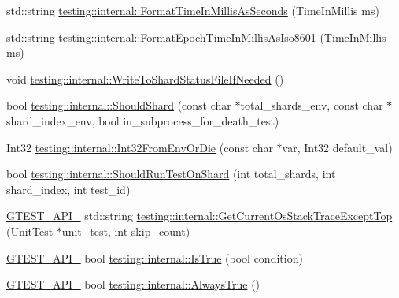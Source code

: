 \begin{DoxyCompactItemize}
\item 
std\+::string \mbox{\hyperlink{namespacetesting_1_1internal_a904485f27a54be8a5a92856e2d838797}{testing\+::internal\+::\+Format\+Time\+In\+Millis\+As\+Seconds}} (Time\+In\+Millis ms)
\item 
std\+::string \mbox{\hyperlink{namespacetesting_1_1internal_a5ef227c4a610e7ff638b12dfb25b068e}{testing\+::internal\+::\+Format\+Epoch\+Time\+In\+Millis\+As\+Iso8601}} (Time\+In\+Millis ms)
\item 
void \mbox{\hyperlink{namespacetesting_1_1internal_a19b35b39782d41e6ef76e1910a3a502e}{testing\+::internal\+::\+Write\+To\+Shard\+Status\+File\+If\+Needed}} ()
\item 
bool \mbox{\hyperlink{namespacetesting_1_1internal_a8688e48645d951b8e42b61d2e4b2890e}{testing\+::internal\+::\+Should\+Shard}} (const char $\ast$total\+\_\+shards\+\_\+env, const char $\ast$shard\+\_\+index\+\_\+env, bool in\+\_\+subprocess\+\_\+for\+\_\+death\+\_\+test)
\item 
Int32 \mbox{\hyperlink{namespacetesting_1_1internal_a7e70cddd54da21e2c2608613d51288e2}{testing\+::internal\+::\+Int32\+From\+Env\+Or\+Die}} (const char $\ast$var, Int32 default\+\_\+val)
\item 
bool \mbox{\hyperlink{namespacetesting_1_1internal_a437bd89f5bc532778d7467600e210395}{testing\+::internal\+::\+Should\+Run\+Test\+On\+Shard}} (int total\+\_\+shards, int shard\+\_\+index, int test\+\_\+id)
\item 
\mbox{\hyperlink{_obj__test_2lib_2googletest-release-1_88_81_2googletest_2include_2gtest_2internal_2gtest-port_8h_aa73be6f0ba4a7456180a94904ce17790}{G\+T\+E\+S\+T\+\_\+\+A\+P\+I\+\_\+}} std\+::string \mbox{\hyperlink{namespacetesting_1_1internal_aeb475922b8cd1e6c60ac052bbc396e62}{testing\+::internal\+::\+Get\+Current\+Os\+Stack\+Trace\+Except\+Top}} (Unit\+Test $\ast$unit\+\_\+test, int skip\+\_\+count)
\item 
\mbox{\hyperlink{_obj__test_2lib_2googletest-release-1_88_81_2googletest_2include_2gtest_2internal_2gtest-port_8h_aa73be6f0ba4a7456180a94904ce17790}{G\+T\+E\+S\+T\+\_\+\+A\+P\+I\+\_\+}} bool \mbox{\hyperlink{namespacetesting_1_1internal_a527b9bcc13669b9a16400c8514266254}{testing\+::internal\+::\+Is\+True}} (bool condition)
\item 
\mbox{\hyperlink{_obj__test_2lib_2googletest-release-1_88_81_2googletest_2include_2gtest_2internal_2gtest-port_8h_aa73be6f0ba4a7456180a94904ce17790}{G\+T\+E\+S\+T\+\_\+\+A\+P\+I\+\_\+}} bool \mbox{\hyperlink{namespacetesting_1_1internal_a922c9da63cd4bf94fc473b9ecac76414}{testing\+::internal\+::\+Always\+True}} ()

\end{DoxyCompactItemize}
